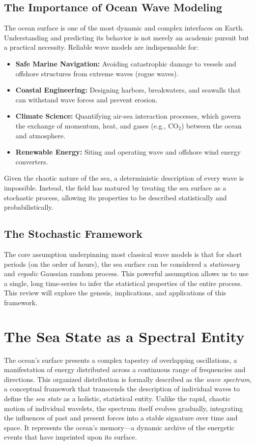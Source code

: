 \documentclass[journal,10pt,twocolumn]{IEEEtran}
\begin{document}
    \subsection{The Importance of Ocean Wave Modeling}
    The ocean surface is one of the most dynamic and complex interfaces on Earth. Understanding and predicting its behavior is not merely an academic pursuit but a practical necessity. Reliable wave models are indispensable for:
    \begin{itemize}[leftmargin=1.4em]
        \item \textbf{Safe Marine Navigation:} Avoiding catastrophic damage to vessels and offshore structures from extreme waves (rogue waves).
        \item \textbf{Coastal Engineering:} Designing harbors, breakwaters, and seawalls that can withstand wave forces and prevent erosion.
        \item \textbf{Climate Science:} Quantifying air-sea interaction processes, which govern the exchange of momentum, heat, and gases (e.g., CO$_2$) between the ocean and atmosphere.
        \item \textbf{Renewable Energy:} Siting and operating wave and offshore wind energy converters.
    \end{itemize}
    Given the chaotic nature of the sea, a deterministic description of every wave is impossible. Instead, the field has matured by treating the sea surface as a stochastic process, allowing its properties to be described statistically and probabilistically.

    \subsection{The Stochastic Framework}
    The core assumption underpinning most classical wave models is that for short periods (on the order of hours), the sea surface can be considered a \textit{stationary} and \textit{ergodic} Gaussian random process. This powerful assumption allows us to use a single, long time-series to infer the statistical properties of the entire process. This review will explore the genesis, implications, and applications of this framework.

    \section{The Sea State as a Spectral Entity}

    The ocean's surface presents a complex tapestry of overlapping oscillations, a manifestation of energy distributed across a continuous range of frequencies and directions. This organized distribution is formally described as the \textit{wave spectrum}, a conceptual framework that transcends the description of individual waves to define the \textit{sea state} as a holistic, statistical entity. Unlike the rapid, chaotic motion of individual wavelets, the spectrum itself evolves gradually, integrating the influences of past and present forces into a stable signature over time and space. It represents the ocean's memory---a dynamic archive of the energetic events that have imprinted upon its surface.
\end{document}
